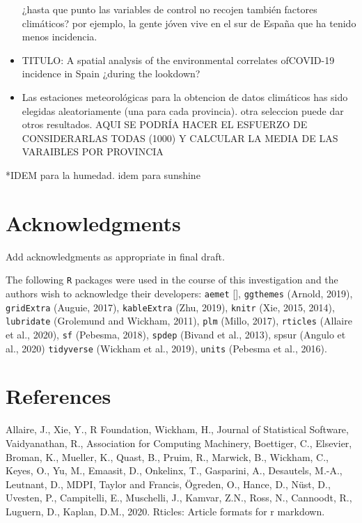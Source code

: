 \documentclass[]{elsarticle} %
\begin{document}
\begin{itemize}
  ¿hasta que punto las variables de control no recojen también factores
  climáticos? por ejemplo, la gente jóven vive en el sur de España que
  ha tenido menos incidencia.
\item
  TITULO: A spatial analysis of the environmental correlates ofCOVID-19
  incidence in Spain ¿during the lookdown?
\item
  Las estaciones meteorológicas para la obtencion de datos climáticos
  has sido elegidas aleatoriamente (una para cada provincia). otra
  seleccion puede dar otros resultados. AQUI SE PODRÍA HACER EL ESFUERZO
  DE CONSIDERARLAS TODAS (1000) Y CALCULAR LA MEDIA DE LAS VARAIBLES POR
  PROVINCIA
\end{itemize}

*IDEM para la humedad. idem para sunshine

\hypertarget{acknowledgments}{%
\section*{Acknowledgments}\label{acknowledgments}}

Add acknowledgments as appropriate in final draft.

The following \texttt{R} packages were used in the course of this
investigation and the authors wish to acknowledge their developers:
\texttt{aemet} {[}{]}, \texttt{ggthemes} (Arnold, 2019),
\texttt{gridExtra} (Auguie, 2017), \texttt{kableExtra} (Zhu, 2019),
\texttt{knitr} (Xie, 2015, 2014), \texttt{lubridate} (Grolemund and
Wickham, 2011), \texttt{plm} (Millo, 2017), \texttt{rticles} (Allaire et
al., 2020), \texttt{sf} (Pebesma, 2018), \texttt{spdep} (Bivand et al.,
2013), spsur (Angulo et al., 2020) \texttt{tidyverse} (Wickham et al.,
2019), \texttt{units} (Pebesma et al., 2016).

\hypertarget{references}{%
\section*{References}\label{references}}

\hypertarget{refs}{}
\leavevmode\hypertarget{ref-Allaire2020}{}%
Allaire, J., Xie, Y., R Foundation, Wickham, H., Journal of Statistical
Software, Vaidyanathan, R., Association for Computing Machinery,
Boettiger, C., Elsevier, Broman, K., Mueller, K., Quast, B., Pruim, R.,
Marwick, B., Wickham, C., Keyes, O., Yu, M., Emaasit, D., Onkelinx, T.,
Gasparini, A., Desautels, M.-A., Leutnant, D., MDPI, Taylor and Francis,
Ögreden, O., Hance, D., Nüst, D., Uvesten, P., Campitelli, E.,
Muschelli, J., Kamvar, Z.N., Ross, N., Cannoodt, R., Luguern, D.,
Kaplan, D.M., 2020. Rticles: Article formats for r markdown.
\end{document}
